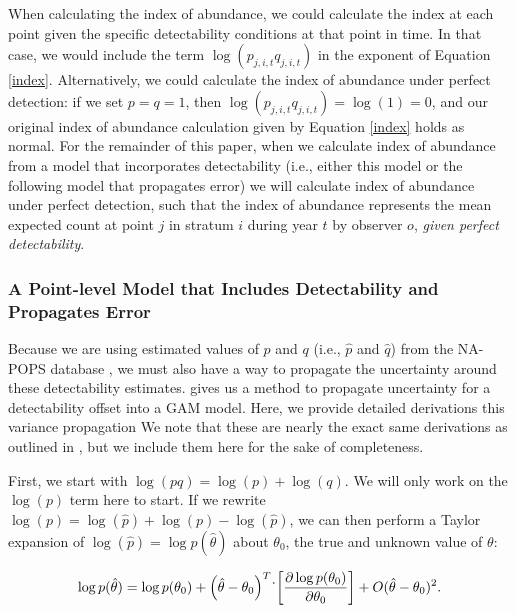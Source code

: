 \documentclass[12pt]{article}
\begin{document}
\par When calculating the index of abundance, we could calculate the index at each point given the specific detectability conditions at that point in time.
In that case, we would include the term $\log(p_{j,i,t}q_{j,i,t})$ in the exponent of Equation \ref{index}.
Alternatively, we could calculate the index of abundance under perfect detection: if we set $p = q = 1$, then $\log(p_{j,i,t}q_{j,i,t}) = \log(1) = 0$, and our original index of abundance calculation given by Equation \ref{index} holds as normal.
For the remainder of this paper, when we calculate index of abundance from a model that incorporates detectability (i.e., either this model or the following model that propagates error) we will calculate index of abundance under perfect detection, such that the index of abundance represents the mean expected count at point $j$ in stratum $i$ during year $t$ by observer $o$, \textit{given perfect detectability}.

\subsubsection{A Point-level Model that Includes Detectability and Propagates Error}\label{varprop-text}

\par Because we are using estimated values of $p$ and $q$ (i.e., $\hat{p}$ and $\hat{q}$) from the NA-POPS database \citep{edwards_point_2023}, we must also have a way to propagate the uncertainty around these detectability estimates. 
\citet{bravington_variance_2021} gives us a method to propagate uncertainty for a detectability offset into a GAM model. 
Here, we provide detailed derivations this variance propagation
We note that these are nearly the exact same derivations as outlined in \citet{bravington_variance_2021}, but we include them here for the sake of completeness.

\par First, we start with $\log(pq) = \log(p) + \log(q)$.
We will only work on the $\log(p)$ term here to start. 
If we rewrite $\log(p) = \log(\hat{p}) + \log(p) - \log(\hat{p})$, we can then perform a Taylor expansion of $\log(\hat{p}) = \log p(\hat{\theta})$ about $\theta_0$, the true and unknown value of $\theta$:

$$\log p(\hat{\theta}) = \log p(\theta_0) + \left( \hat{\theta} - \theta_0 \right)^T \dot \\ \left[ \dfrac{\partial \log p({\theta_0})}{\partial {\theta_0}}  \right] + O(\hat{\theta} - \theta_0)^2. $$
\end{document}
